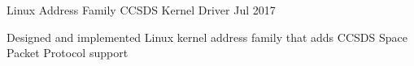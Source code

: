 

\begin{cventries}

  \cventry
  {Linux Address Family} %
  {CCSDS Kernel Driver} %
  {} %
  {Jul 2017} %
    {
      \begin{cvitems} %
      \item {Designed and implemented Linux kernel address family that adds CCSDS Space Packet Protocol support}
      \end{cvitems}
    }

\end{cventries}
